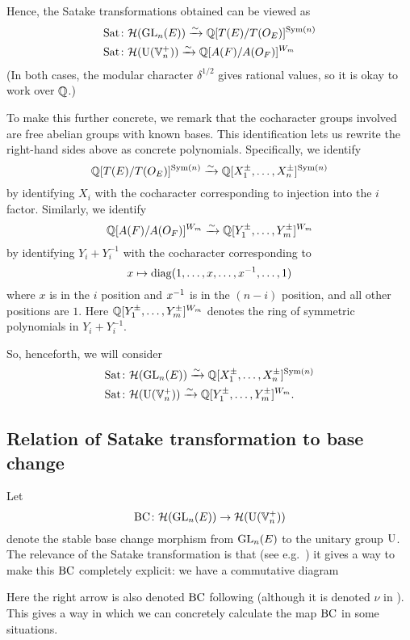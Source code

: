 Hence, the Satake transformations obtained can be viewed as
\begin{align*}
  \operatorname{Sat} &\colon \mathcal H(\operatorname{GL}_n(E)) \xrightarrow{\sim} \mathbb Q[T(E) / T(O_E)]^{\operatorname{Sym}(n)} \\
  \operatorname{Sat} &\colon \mathcal H(\operatorname{U}(\mathbb V_n^+))\xrightarrow{\sim} \mathbb Q[A(F) / A(O_F)]^{W_m}
\end{align*}
(In both cases, the modular character $\delta^{1/2}$ gives rational values,
so it is okay to work over $\mathbb Q$.)

To make this further concrete, we remark that the cocharacter groups
involved are free abelian groups with known bases.
This identification lets us rewrite the right-hand sides above as concrete polynomials.
Specifically, we identify
\[ \mathbb Q[T(E) / T(O_E)]^{\operatorname{Sym}(n)}
  \xrightarrow{\sim} \mathbb Q[X_1^\pm, \dots, X_n^\pm]^{\operatorname{Sym}(n)} \]
by identifying $X_i$ with the
cocharacter corresponding to injection into the $i$ factor.
Similarly, we identify
\[ \mathbb Q[A(F) / A(O_F)]^{W_m}
  \xrightarrow{\sim} \mathbb Q[Y_1^{\pm}, \dots, Y_m^{\pm}]^{W_m} \]
by identifying $Y_i + Y_i^{-1}$
with the cocharacter corresponding to
\[ x \mapsto \operatorname{diag}(1, \dots, x, \dots, x^{-1}, \dots, 1) \]
where $x$ is in the $i$ position and $x^{-1}$ is in the $(n-i)$ position,
and all other positions are $1$.
Here $\mathbb Q[Y_1^{\pm}, \dots, Y_m^{\pm}]^{W_m}$
denotes the ring of symmetric polynomials in $Y_i + Y_i^{-1}$.

So, henceforth, we will consider
\begin{align*}
  \operatorname{Sat} &\colon \mathcal H(\operatorname{GL}_n(E)) \xrightarrow{\sim} \mathbb Q[X_1^\pm, \dots, X_n^\pm]^{\operatorname{Sym}(n)} \\
  \operatorname{Sat} &\colon \mathcal H(\operatorname{U}(\mathbb V_n^+)) \xrightarrow{\sim} \mathbb Q[Y_1^{\pm}, \dots, Y_m^{\pm}]^{W_m}.
\end{align*}

\subsection{Relation of Satake transformation to base change}
Let
\[ \operatorname{BC} \colon \mathcal H(\operatorname{GL}_n(E)) \to \mathcal H(\operatorname{U}(\mathbb V_n^+)) \]
denote the stable base change morphism from $\operatorname{GL}_n(E)$ to the unitary group $\operatorname{U}$.
The relevance of the Satake transformation is that
(see e.g.\ \cite[Proposition 3.4]{ref:leslie})
it gives a way to make this $\operatorname{BC}$ completely explicit:
we have a commutative diagram
\begin{center}
\end{center}
Here the right arrow is also denoted $\operatorname{BC}$ following \cite{ref:AFLspherical}
(although it is denoted $\nu$ in \cite{ref:leslie}).
This gives a way in which we can concretely calculate the map $\operatorname{BC}$
in some situations.

